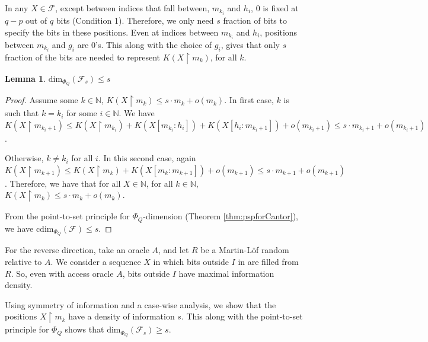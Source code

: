 \documentclass[11pt]{article}
\newtheorem{lemma}{Lemma}
\newcommand{\restr}{\upharpoonright}
\newcommand{\N}{\mathbb{N}}
\newcommand{\cdim}{\mathrm{cdim}}
\renewcommand{\dim}{{\mathrm{dim}}}
\newcommand{\F}{{\mathcal{F}}}
\renewcommand{\F}{\mathcal{F}}
\begin{document}
In any $X \in \F$, except between indices that fall between, $m_{k_i}$ and $h_i$, $0$ is fixed at $q - p$ out of $q$ bits (Condition 1). Therefore, we only need $s$ fraction of bits to specify the bits in these positions. Even at indices between $m_{k_i}$ and $h_i$, positions between $m_{k_i}$ and $g_i$ are $0$'s. This along with the choice of $g_i$, gives that only $s$ fraction of the bits are needed to represent $K(X \restr m_k)$, for all $k$. 

\begin{lemma} \label{lem:dimQF_slts}
	$\dim_{\Phi_Q}(\F_s) \leq s$
\end{lemma}
\begin{proof}
	Assume some $k \in \N$, $K(X \restr m_k) \leq s \cdot m_k + o(m_k)$. In first case, $k$ is such that $k = k_i$ for some $i \in \N$. We have $K(X \restr m_{k_i + 1}) \leq K(X \restr m_{k_i}) + K(X[m_{k_i} : h_i]) + K(X[h_i : m_{k_i+1}]) + o(m_{{k_i}+1}) \leq s \cdot m_{k_i+1} + o(m_{k_i+1})$. 
	
	Otherwise,  $k \neq k_i$ for all $i$. In this second case, again $K(X \restr m_{k+1}) \leq K(X \restr m_k) + K(X[m_k : m_{k+1}]) + o(m_{k+1}) \leq s \cdot m_{k+1} + o(m_{k+1})$. Therefore, we have that for all $X \in \N$, for all $k \in \N$, $K(X \restr m_k) \leq s \cdot m_k  +o(m_k)$.
	
	From the point-to-set principle  for $\Phi_Q$-dimension (Theorem \ref{thm:pspforCantor}), we have $\cdim_{\Phi_Q}(\F) \leq s$.
\end{proof}




For the reverse direction, take an oracle $A$, and let $R$ be a Martin-L\"of random relative to $A$. We consider a sequence $X$ in which bits outside $I$ in are filled from $R$.
So, even with access oracle $A$, bits outside $I$ have maximal information density. 

Using symmetry of information and a case-wise analysis, we show that the positions $X \restr m_k$ have a density of information $s$. This along with the point-to-set principle for $\Phi_Q$ shows that $\dim_{\Phi_Q}(\F_s) \geq s$.
\end{document}
